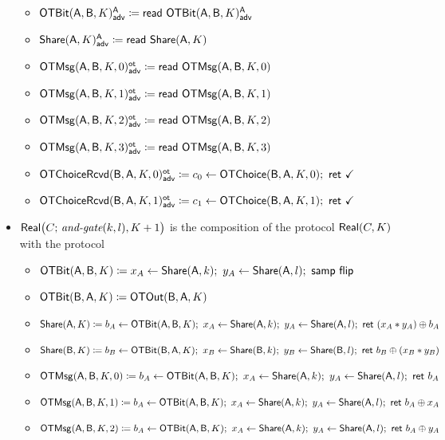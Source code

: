 \begin{itemize}
\begin{itemize}
\item {\color{blue} $\mathsf{OTBit}(\mathsf{A},\mathsf{B},K)^{\mathsf{A}}_{\mathsf{adv}} \coloneqq \mathsf{read} \ \mathsf{OTBit}(\mathsf{A},\mathsf{B},K)^{\mathsf{A}}_{\mathsf{adv}}$}
\item {\color{blue} $\mathsf{Share}(\mathsf{A},K)^{\mathsf{A}}_{\mathsf{adv}} \coloneqq \mathsf{read} \ \mathsf{Share}(\mathsf{A},K)$}\medskip
\item {\color{blue} $\mathsf{OTMsg}(\mathsf{A},\mathsf{B},K,0)^{\mathsf{ot}}_{\mathsf{adv}} \coloneqq \mathsf{read} \ \mathsf{OTMsg}(\mathsf{A},\mathsf{B},K,0)$}
\item {\color{blue} $\mathsf{OTMsg}(\mathsf{A},\mathsf{B},K,1)^{\mathsf{ot}}_{\mathsf{adv}} \coloneqq \mathsf{read} \ \mathsf{OTMsg}(\mathsf{A},\mathsf{B},K,1)$}
\item {\color{blue} $\mathsf{OTMsg}(\mathsf{A},\mathsf{B},K,2)^{\mathsf{ot}}_{\mathsf{adv}} \coloneqq \mathsf{read} \ \mathsf{OTMsg}(\mathsf{A},\mathsf{B},K,2)$}
\item {\color{blue} $\mathsf{OTMsg}(\mathsf{A},\mathsf{B},K,3)^{\mathsf{ot}}_{\mathsf{adv}} \coloneqq \mathsf{read} \ \mathsf{OTMsg}(\mathsf{A},\mathsf{B},K,3)$}\medskip
\item {\color{blue} $\LeakOTChoiceRcvd(\B,\A,K,0)^\ot_\adv \coloneqq c_0 \leftarrow \OTChoice(\B,\A,K,0); \ \ret{\checkmark}$}
\item {\color{blue} $\LeakOTChoiceRcvd(\B,\A,K,1)^\ot_\adv \coloneqq c_1 \leftarrow \OTChoice(\B,\A,K,1); \ \ret{\checkmark}$}
\end{itemize}
\item $\mathsf{Real}\big(C; \, \textit{and-gate}(k,l),K+1\big)$ is the composition of the protocol $\mathsf{Real}(C,K)$ with the protocol
\begin{itemize}
\item $\OTBit(\A,\B,K) \coloneqq x_A \leftarrow \Share(\A,k); \ y_A \leftarrow \Share(\A,l); \ \samp{\flip}$
\item $\mathsf{OTBit}(\mathsf{B},\mathsf{A},K) \coloneqq \mathsf{OTOut}(\mathsf{B},\mathsf{A},K)$\smallskip
\item $\mathsf{Share}(\mathsf{A},K) \coloneqq b_A \leftarrow \mathsf{OTBit}(\mathsf{A},\mathsf{B},K); \ x_A \leftarrow \mathsf{Share}(\mathsf{A},k); \ y_A \leftarrow \mathsf{Share}(\mathsf{A},l); \ \mathsf{ret} \ (x_A * y_A) \oplus b_A$
\item $\mathsf{Share}(\mathsf{B},K) \coloneqq b_B \leftarrow \mathsf{OTBit}(\mathsf{B},\mathsf{A},K); \ x_B \leftarrow \mathsf{Share}(\mathsf{B},k); \ y_B \leftarrow \mathsf{Share}(\mathsf{B},l); \ \mathsf{ret} \ b_B \oplus (x_B * y_B)$\smallskip
\item $\mathsf{OTMsg}(\mathsf{A},\mathsf{B},K,0) \coloneqq b_A \leftarrow \mathsf{OTBit}(\mathsf{A},\mathsf{B},K); \ x_A \leftarrow \mathsf{Share}(\mathsf{A},k); \ y_A \leftarrow \mathsf{Share}(\mathsf{A},l); \ \mathsf{ret} \ b_A$
\item $\mathsf{OTMsg}(\mathsf{A},\mathsf{B},K,1) \coloneqq b_A \leftarrow \mathsf{OTBit}(\mathsf{A},\mathsf{B},K); \ x_A \leftarrow \mathsf{Share}(\mathsf{A},k); \ y_A \leftarrow \mathsf{Share}(\mathsf{A},l); \ \mathsf{ret} \ b_A \oplus x_A$
\item $\mathsf{OTMsg}(\mathsf{A},\mathsf{B},K,2) \coloneqq b_A \leftarrow \mathsf{OTBit}(\mathsf{A},\mathsf{B},K); \ x_A \leftarrow \mathsf{Share}(\mathsf{A},k); \ y_A \leftarrow \mathsf{Share}(\mathsf{A},l); \ \mathsf{ret} \ b_A \oplus y_A$

\end{itemize}
\end{itemize}
